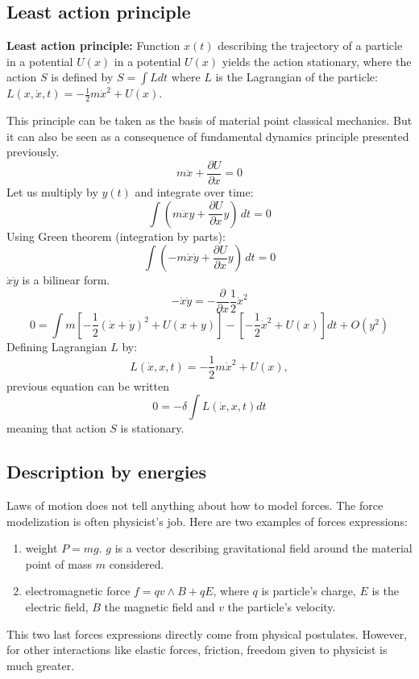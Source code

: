 \documentclass[12pt]{book}
\begin{document}
\subsection{Least action principle}\label{secprinmoindreact}
\begin{prin}{\bf Least action principle:}
Function $x(t)$ describing the trajectory of a particle in a potential
$U(x)$ in a potential $U(x)$ yields the action stationary, where the action $S$ is defined
by $S=\int L dt$ where $L$ is the Lagrangian of the particle: 
$L(x,\dot x,t)=-\frac{1}{2}m\dot x ^2+U(x)$. 
\end{prin}
This principle can be taken as the basis of material point classical
mechanics. But it can also be seen as a consequence of fundamental dynamics
principle presented previously\cite{ma:equad:Arnold83}.
\begin{equation}
m \ddot{x}+\frac{\partial U}{\partial x}=0
\end{equation}
Let us multiply by $y(t)$ and integrate over time:
\begin{equation}
\int (m \ddot{x}y +\frac{\partial U}{\partial x}y)\,dt=0
\end{equation}
Using Green theorem (integration by parts):
\begin{equation}
\int (-m \dot{x}\dot{y} +\frac{\partial U}{\partial x}y)\,dt=0
\end{equation}
$\dot{x}\dot{y}$ is a bilinear form.
\begin{equation}
-\dot{x}\dot{y}=-\frac{\partial }{\partial x}\frac{1}{2}\dot{x}^2
\end{equation}
\begin{equation}
0= \int m
[-\frac{1}{2}(\dot{x}+\dot{y})^{2}+U(x+y)]
-[-\frac{1}{2}\dot{x}^{2}+U(x)]dt+O(y^{2}) 
\end{equation}
Defining Lagrangian $L$ by:
\begin{equation}
L(\dot{x},x,t)=-\frac{1}{2}m\dot x ^2+U(x),
\end{equation}
previous equation can be written
\begin{equation}
0=-\delta \int L(\dot{x},x,t)dt
\end{equation}
meaning that action $S$ is stationary.
\subsection{Description by energies}
Laws of motion does not tell anything about how to model
forces. The force modelization is often physicist's job. Here are two
examples of 
forces expressions:  
\begin{enumerate}
\item weight $P=mg$. $g$ is a vector describing gravitational field around the
  material point of mass $m$ considered.
\item electromagnetic force $f=qv\wedge B+qE$, where $q$ is particle's
  charge, $E$ is the electric field, $B$ the magnetic field and $v$ the
  particle's velocity.
\end{enumerate} 
This two last forces expressions directly come from physical
postulates. However, for other interactions like elastic forces, friction,
freedom given to physicist is much greater.
\end{document}
